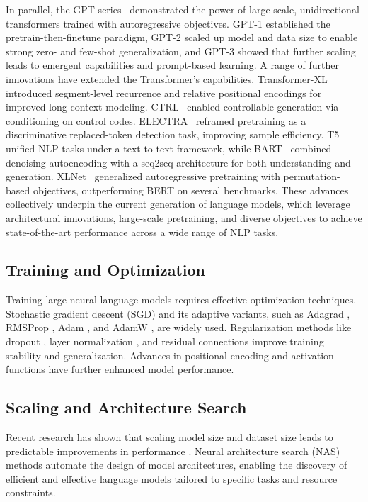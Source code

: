 In parallel, the GPT series~\citep{radford2018gpt1, radford2019gpt2, brown2020gpt3} demonstrated the power of large-scale, unidirectional transformers trained with autoregressive objectives. GPT-1 established the pretrain-then-finetune paradigm, GPT-2 scaled up model and data size to enable strong zero- and few-shot generalization, and GPT-3 showed that further scaling leads to emergent capabilities and prompt-based learning.
A range of further innovations have extended the Transformer’s capabilities. Transformer-XL~\citep{dai2019transformer} introduced segment-level recurrence and relative positional encodings for improved long-context modeling. CTRL~\citep{keskar2019ctrl} enabled controllable generation via conditioning on control codes. ELECTRA~\citep{clark2020electra} reframed pretraining as a discriminative replaced-token detection task, improving sample efficiency. T5~\citep{raffel2020t5} unified NLP tasks under a text-to-text framework, while BART~\citep{lewis2020bart} combined denoising autoencoding with a seq2seq architecture for both understanding and generation. XLNet~\citep{yang2019xlnet} generalized autoregressive pretraining with permutation-based objectives, outperforming BERT on several benchmarks.
These advances collectively underpin the current generation of language models, which leverage architectural innovations, large-scale pretraining, and diverse objectives to achieve state-of-the-art performance across a wide range of NLP tasks.

\subsection{Training and Optimization}
Training large neural language models requires effective optimization techniques. Stochastic gradient descent (SGD) \citep{robbins1951stochastic} and its adaptive variants, such as Adagrad \citep{duchi2011adaptive}, RMSProp \citep{tieleman2012lecture}, Adam \citep{kingma2015adam}, and AdamW \citep{loshchilov2019decoupled}, are widely used. Regularization methods like dropout \citep{srivastava2014dropout}, layer normalization \citep{ba2016layernorm}, and residual connections \citep{he2016deep} improve training stability and generalization. Advances in positional encoding \citep{vaswani2017attention, shaw2018self, su2021roformer, press2021train} and activation functions \citep{hendrycks2016gelu, ramachandran2017searching, shazeer2020swiglu} have further enhanced model performance.

\subsection{Scaling and Architecture Search}
Recent research has shown that scaling model size and dataset size leads to predictable improvements in performance \citep{kaplan2020scaling, zhang2023train}. Neural architecture search (NAS) methods \citep{zoph2016neural, chen2021autoformer, xu2021nasbert} automate the design of model architectures, enabling the discovery of efficient and effective language models tailored to specific tasks and resource constraints.


